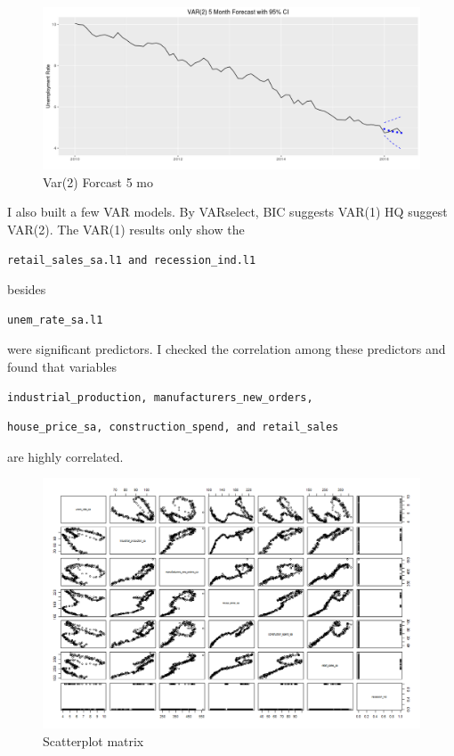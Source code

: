 \documentclass[twoside,twocolumn]{article}
\begin{document}
    \begin{figure}[htb]
    	\centering
     	\caption{Var(2) Forcast 5 mo}
     	\includegraphics[width=\linewidth]{images/var25mo}
 \end{figure}
 
I also built a few VAR models. By VARselect, BIC suggests VAR(1) HQ suggest VAR(2). The VAR(1) results only show the \begin{verbatim}retail_sales_sa.l1 and recession_ind.l1\end{verbatim} besides \begin{verbatim}unem_rate_sa.l1\end{verbatim} were significant predictors. I checked the correlation among these predictors and found that variables \begin{verbatim}industrial_production, manufacturers_new_orders, \end{verbatim} \begin{verbatim}house_price_sa, construction_spend, and retail_sales\end{verbatim} are highly correlated.

    \begin{figure}[htb]
    	\centering
     	\caption{Scatterplot matrix}
     	\includegraphics[width=\linewidth]{images/varcorrelation}
 \end{figure}
\end{document}
